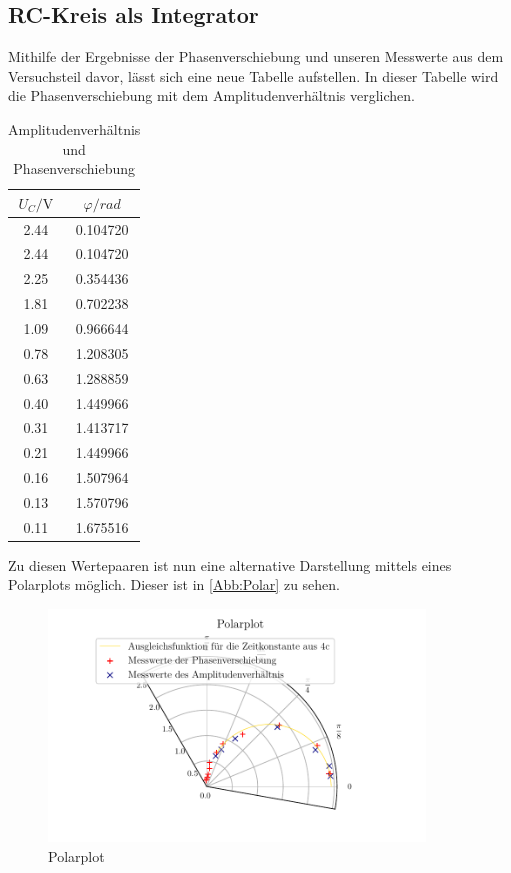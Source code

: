 \subsection{RC-Kreis als Integrator}

Mithilfe der Ergebnisse der Phasenverschiebung und unseren Messwerte aus dem Versuchsteil davor, lässt sich eine neue Tabelle aufstellen. In dieser Tabelle
wird die Phasenverschiebung mit dem Amplitudenverhältnis verglichen.

\begin{table}
  \centering
  \caption{Amplitudenverhältnis und Phasenverschiebung}
  \label{tab:Uphi}
  \begin{tabular}{c c}
    \toprule
    $U_C/\unit{\volt}$ & $\varphi / rad$ \\
    \midrule      
    2.44  & 0.104720 \\
    2.44  & 0.104720\\
    2.25  & 0.354436\\
    1.81  &  0.702238\\
    1.09  &  0.966644\\
    0.78  & 1.208305\\
    0.63  &  1.288859\\
    0.40  & 1.449966\\
    0.31  & 1.413717\\
    0.21  & 1.449966\\
    0.16  & 1.507964\\
    0.13  & 1.570796\\
    0.11  & 1.675516\\
    \bottomrule
  \end{tabular}
\end{table}

Zu diesen Wertepaaren ist nun eine alternative Darstellung mittels eines Polarplots möglich. Dieser ist in \autoref{Abb:Polar} zu sehen.
\begin{figure}
  \centering
  \includegraphics[width=100mm,scale=0.5]{build/polarplot.pdf}
  \caption{Polarplot}
  \label{Abb:Polar}
\end{figure}

